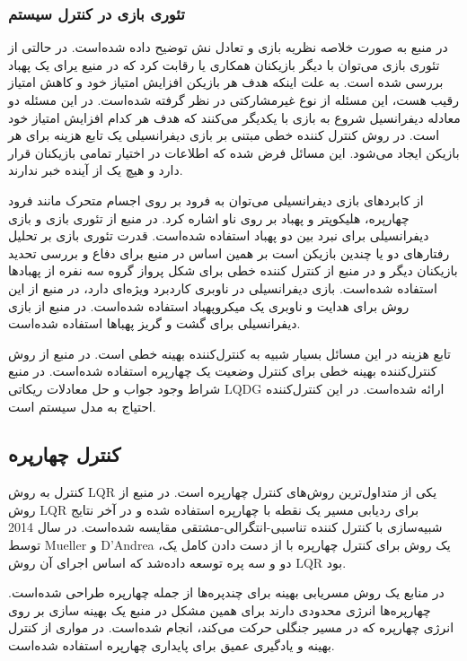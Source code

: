 \subsubsection{تئوری بازی در کنترل سیستم}
در منبع \cite{article1} به صورت خلاصه نظریه بازی و تعادل نش توضیح داده شده‌است. در حالتی از تئوری بازی می‌توان با دیگر بازیکنان همکاری یا رقابت کرد که در منیع\cite{8376282} یرای یک پهباد بررسی شده است. به علت اینکه هدف هر بازیکن افزایش امتیاز خود و کاهش امتیاز رقیب هست، این مسئله از نوع غیرمشارکتی در نظر گرفته شده‌است. در این مسئله دو معادله دیفرانسیل شروع به بازی با یکدیگر می‌کنند که هدف هر کدام افزایش امتیاز خود است. در روش کنترل کننده خطی مبتنی بر بازی دیفرانسیلی یک تابع هزینه برای هر بازیکن ایجاد می‌شود. این مسائل فرض شده که اطلاعات در اختیار تمامی بازیکنان قرار دارد و هیچ یک از آینده خبر ندارند.

از کابردهای بازی دیفرانسیلی می‌توان به فرود بر روی اجسام متحرک مانند فرود چهارپره، هلیکوپتر و پهباد بر روی ناو\cite{8996044} اشاره کرد. در منبع \cite{9001045} از تئوری بازی و بازی دیفرانسیلی برای نبرد بین دو پهباد استفاده شده‌است. قدرت تئوری بازی بر تحلیل رفتارهای دو یا چندین بازیکن است بر همین اساس در منبع \cite{Pachter2019} برای دفاع و بررسی تحدید بازیکنان دیگر و در منبع \cite{7502594} از کنترل کننده خطی برای شکل پرواز گروه سه نفره از پهبادها استفاده شده‌است. بازی دیفرانسیلی در ناوبری کاردبرد ویژه‌ای دارد، در منبع \cite{6160198} از این روش برای هدایت و ناوبری یک میکروپهباد استفاده شده‌است. در منبع \cite{1595165} از بازی دیفرانسیلی برای گشت و گریز پهباها استفاده شده‌است.

تابع هزینه در این مسائل بسیار شبیه به کنترل‌کننده بهینه خطی است. در منبع \cite{4399042} از روش کنترل‌کننده بهینه خطی برای کنترل وضعیت یک چهارپره استفاده شده‌است. در منبع \cite{article2} شراط وجود جواب و حل معادلات ریکاتی  LQDG ارائه شده‌است. در این کنترل‌کننده احتیاج به مدل سیستم است.
\subsection{کنترل چهارپره}
کنترل به روش LQR یکی از متداول‌ترین روش‌های کنترل چهارپره است.
در منبع \cite{8394911} از روش LQR برای ردیابی مسیر یک نقطه   با چهارپره استفاده شده و در آخر نتایج شبیه‌سازی با کنترل کننده تناسبی-انتگرالی-مشتقی مقایسه شد‌ه‌است. 
در سال 2014 توسط Mueller و D’Andrea یک روش برای کنترل چهارپره با از دست دادن کامل یک، دو و سه پره توسعه داده‌شد که اساس اجرای آن روش LQR بود\cite{6906588}.

در منابع \cite{Lee2017} \cite{8396617} یک روش مسریابی بهینه برای چندپره‌ها از جمله چهارپره طراحی شده‌است. چهارپره‌ها انرژی محدودی دارند برای همین مشکل در منبع \cite{9029345} یک بهینه سازی بر روی انرژی چهارپره که در مسیر جنگلی حرکت می‌کند، انجام شده‌است. در مواری \cite{DBLP:journals/corr/abs-1912-07067}از کنترل بهینه و یادگیری عمیق  برای پایداری چهارپره استفاده شده‌است.